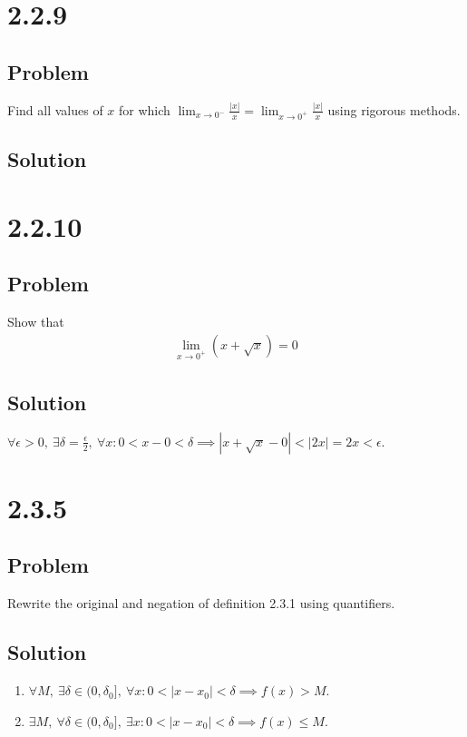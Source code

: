 \documentclass[12pt]{article}
\newcommand{\round}[1]{\left(       #1 \right)      }
\newcommand{\abs}  [1]{\left|       #1 \right|      }
\begin{document}
\section*{2.2.9}

\subsection*{Problem}
Find all values of $x$ for which $\lim_{x \to 0^-} \frac{\abs{x}}{x} = \lim_{x \to 0^+} \frac{\abs{x}}{x}$ using rigorous methods.

\subsection*{Solution}




\section*{2.2.10}

\subsection*{Problem}
Show that
\begin{align*}
    \lim_{x \to 0^+} \round{x + \sqrt{x}} = 0
\end{align*}

\subsection*{Solution}
$\forall \epsilon > 0,\ \exists \delta = \frac{\epsilon}{2},\ \forall x : 0 < x - 0 < \delta \implies \abs{x + \sqrt{x} - 0} < \abs{2x} = 2x < \epsilon$.

\section*{2.3.5}

\subsection*{Problem}
Rewrite the original and negation of definition 2.3.1 using quantifiers.

\subsection*{Solution}
\begin{enumerate}
    \item $\forall M,\ \exists \delta \in (0, \delta_0],\ \forall x : 0 < \abs{x - x_0} < \delta \implies f(x) > M$.
    \item $\exists M,\ \forall \delta \in (0, \delta_0],\ \exists x : 0 < \abs{x - x_0} < \delta \implies f(x) \leq M$.
\end{enumerate}
\end{document}

